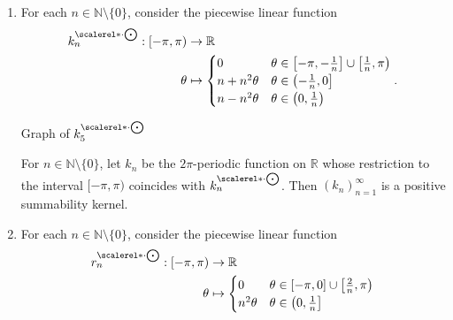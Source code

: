 \documentclass[notoc,notitlepage]{tufte-book}
\DeclareMathOperator*{\bigcdot}{\scalerel*{\cdot}{\bigodot}}
\begin{document}
\begin{eg}
  \begin{enumerate}
    \item For each $n \in \mathbb{N} \setminus \{ 0 \}$,
      consider the piecewise linear function
      \begin{align*}
        k_n^{\bigcdot} : [-\pi, \pi) &\to \mathbb{R} \\
        \theta &\mapsto \begin{cases}
          0              & \theta \in \left[-\pi, -\frac{1}{n}\right] \cup \left[ \frac{1}{n}, \pi \right) \\
          n + n^2 \theta & \theta \in \left( -\frac{1}{n}, 0 \right] \\
          n - n^2 \theta & \theta \in \left( 0, \frac{1}{n} \right)
        \end{cases}.
      \end{align*}
      \begin{marginfigure}
        \centering
        \caption{Graph of $k_5^{\bigcdot}$}\label{fig:graph_of_k_5_bigcdot_}
      \end{marginfigure}
      For $n \in \mathbb{N} \setminus \{ 0 \}$, let $k_n$ be the
      $2\pi$-periodic function on $\mathbb{R}$ whose restriction
      to the interval $[-\pi, \pi)$ coincides with $k_n^{\bigcdot}$.
      Then $(k_n)_{n=1}^{\infty}$ is a positive summability kernel.
    \item For each $n \in \mathbb{N} \setminus \{ 0 \}$,
      consider the piecewise linear function
      \begin{align*}
        r_n^{\bigcdot} : [-\pi, \pi) &\to \mathbb{R} \\
        \theta &\mapsto \begin{cases}
          0              & \theta \in [-\pi, 0] \cup \left[ \frac{2}{n}, \pi \right) \\
          n^2 \theta & \theta \in \left( 0, \frac{1}{n} \right] \\

\end{cases}
\end{align*}
\end{enumerate}
\end{eg}
\end{document}
